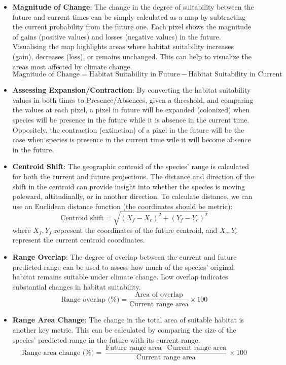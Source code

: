 \documentclass[
]{article}
\begin{document}
\begin{itemize}
\item
  \textbf{Magnitude of Change}: The change in the degree of suitability
  between the future and current times can be simply calculated as a map
  by subtracting the current probability from the future one. Each pixel
  shows the magnitude of gains (positive values) and losses (negative
  values) in the future. Visualising the map highlights areas where
  habitat suitability increases (gain), decreases (loss), or remains
  unchanged. This can help to visualize the areas most affected by
  climate change. \[
     \text{Magnitude of Change} = \text{Habitat Suitability in Future} - \text{Habitat Suitability in Current}
     \]
\item
  \textbf{Assessing Expansion/Contraction}: By converting the habitat
  suitability values in both times to Presence/Absences, given a
  threshold, and comparing the values at each pixel, a pixel in future
  will be expanded (colonized) when species will be presence in the
  future while it is absence in the current time. Oppositely, the
  contraction (extinction) of a pixel in the future will be the case
  when species is presence in the current time wile it will become
  absence in the future.
\item
  \textbf{Centroid Shift}: The geographic centroid of the species' range
  is calculated for both the current and future projections. The
  distance and direction of the shift in the centroid can provide
  insight into whether the species is moving poleward, altitudinally, or
  in another direction. To calculate distance, we can use an Euclidean
  distance function (the coordinates should be metric): \[
     \text{Centroid shift} = \sqrt{(X_f - X_c)^2 + (Y_f - Y_c)^2}
     \] where \(X_f, Y_f\) represent the coordinates of the future
  centroid, and \(X_c, Y_c\) represent the current centroid coordinates.
\item
  \textbf{Range Overlap}: The degree of overlap between the current and
  future predicted range can be used to assess how much of the species'
  original habitat remains suitable under climate change. Low overlap
  indicates substantial changes in habitat suitability. \[
     \text{Range overlap (\%)} = \frac{\text{Area of overlap}}{\text{Current range area}} \times 100
     \]
\item
  \textbf{Range Area Change}: The change in the total area of suitable
  habitat is another key metric. This can be calculated by comparing the
  size of the species' predicted range in the future with its current
  range. \[
     \text{Range area change (\%)} = \frac{\text{Future range area} - \text{Current range area}}{\text{Current range area}} \times 100
     \]
\end{itemize}
\end{document}
